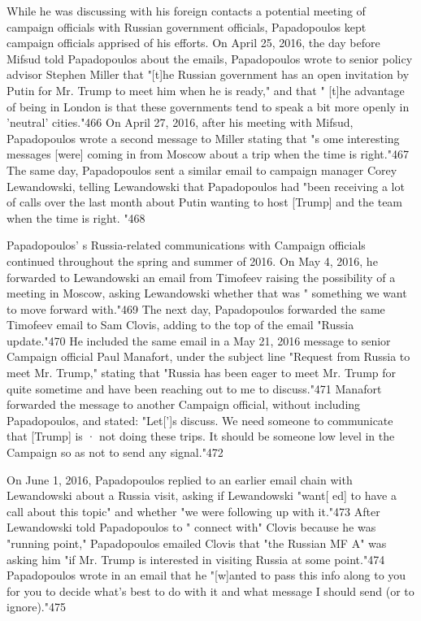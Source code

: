 While he was discussing with his foreign contacts a potential meeting of campaign officials with Russian government officials, Papadopoulos kept campaign officials apprised of his efforts. On April 25, 2016, the day before Mifsud told Papadopoulos about the emails, Papadopoulos wrote to senior policy advisor Stephen Miller that "[t]he Russian government has an open invitation by Putin for Mr. Trump to meet him when he is ready,"  and that " [t]he advantage of being in London is that these governments tend to speak a bit more openly in 'neutral' cities."466 On April 27, 2016, after his meeting with Mifsud, Papadopoulos wrote a second message to Miller stating that "s ome interesting messages [were] coming in from Moscow about a trip when the time is right."467 The same day, Papadopoulos sent a similar email to campaign manager Corey Lewandowski, telling Lewandowski that Papadopoulos had "been receiving a lot of calls over the last month about Putin wanting to host [Trump] and the team when the time is right. "468

Papadopoulos' s Russia-related communications with Campaign officials continued throughout the spring and summer of 2016. On May 4, 2016, he forwarded to Lewandowski an email from Timofeev raising the possibility of a  meeting in Moscow,  asking Lewandowski whether that was " something we want to move forward with."469 The next day, Papadopoulos forwarded the same Timofeev email to Sam Clovis, adding to the top of the email "Russia update."470 He included the same email in a May 21, 2016 message to senior Campaign official Paul Manafort, under the subject line  "Request from Russia to meet Mr. Trump,"  stating that "Russia has been eager to meet Mr. Trump for quite sometime and have been reaching out to me to discuss."471 Manafort forwarded the message to another Campaign official, without including Papadopoulos, and stated: "Let[']s discuss. We need someone to communicate that [Trump] is · not doing these trips. It should be someone low level in the Campaign so as not to send any signal."472

On June 1, 2016, Papadopoulos replied to an earlier email chain with Lewandowski about a Russia visit, asking if Lewandowski "want[ ed] to have a call about this topic"  and whether "we were following up with it."473 After Lewandowski told Papadopoulos to " connect with" Clovis because he was "running point," Papadopoulos emailed Clovis that "the Russian MF A" was asking him "if Mr. Trump is interested in visiting Russia at some point."474 Papadopoulos wrote in an email that he "[w]anted to pass this info along to you for you to decide what's best to do with it and what message I should send (or to ignore)."475

